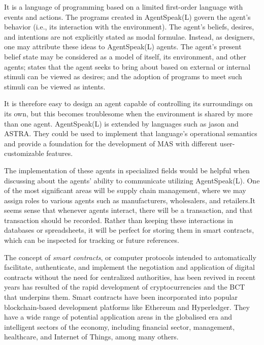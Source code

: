 \vspace{.5cm}

It is a language of programming based on a limited first-order language with events and actions. The programs created in AgentSpeak(L) govern the agent's behavior (i.e., its interaction with the environment). The agent's beliefs, desires, and intentions are not explicitly stated as modal formulae. Instead, as designers, one may attribute these ideas to AgentSpeak(L) agents. The agent's present belief state may be considered as a model of itself, its environment, and other agents; states that the agent seeks to bring about based on external or internal stimuli can be viewed as desires; and the adoption of programs to meet such stimuli can be viewed as intents. 

\vspace{.5cm}

It is therefore easy to design an agent capable of controlling its surroundings on its own, but this becomes troublesome when the environment is shared by more than one agent. AgentSpeak(L) is extended by languages such as jason and \ac{ASTRA}. They could be used to implement that language's operational semantics and provide a foundation for the development of \ac{MAS} with different user-customizable features.

\vspace{.5cm}

The implementation of these agents in specialized fields would be helpful when discussing about the agents' ability to communicate utilizing AgentSpeak(L). One of the most significant areas will be supply chain management, where we may assign roles to various agents such as manufacturers, wholesalers, and retailers.It seems sense that whenever agents interact, there will be a transaction, and that transaction should be recorded. Rather than keeping these interactions in databases or spreadsheets, it will be perfect for storing them in smart contracts, which can be inspected for tracking or future references. 

\vspace{.5cm}

The concept of \textit{smart contracts}, or computer protocols intended to automatically facilitate, authenticate, and implement the negotiation and application of digital contracts without the need for centralized authorities, has been revived in recent years has resulted of the rapid development of cryptocurrencies and the \ac{BCT} that underpins them. Smart contracts have been incorporated into popular blockchain-based development platforms like Ethereum and Hyperledger. They have a wide range of potential application areas in the globalised era and intelligent sectors of the economy, including financial sector, management, healthcare, and Internet of Things, among many others.

